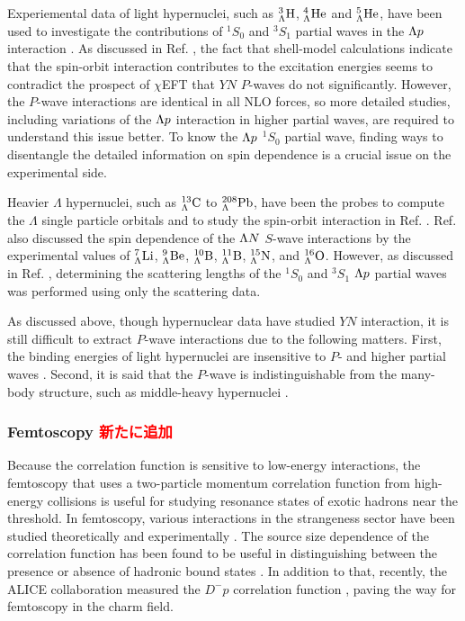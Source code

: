 Experiemental data of light hypernuclei, such as ${}_\Lambda^3\rm{H}$, ${}_\Lambda^4\rm{He}$ and ${}_\Lambda^5\rm{He}$, have been used to investigate the contributions of $^1S_0$ and $^3S_1$ partial waves in the $\Lambda p$ interaction \cite{chiEFT-2020}\cite{chiEFT-2020_2}. As discussed in Ref. \cite{chiEFT-2020_2}, the fact that shell-model calculations indicate that the spin-orbit interaction contributes to the excitation energies seems to contradict the prospect of $\chi$EFT that $YN$ $P$-waves do not significantly. However, the $P$-wave interactions are identical in all NLO forces, so more detailed studies, including variations of the $\Lambda p$ interaction in higher partial waves, are required to understand this issue better. To know the $\Lambda p$ $^1S_0$ partial wave, finding ways to disentangle the detailed information on spin dependence is a crucial issue on the experimental side. 

Heavier $\Lambda$ hypernuclei, such as ${}_\Lambda^{13}\rm{C}$ to ${}_\Lambda^{208}\rm{Pb}$, have been the probes to compute the $\Lambda$ single particle orbitals and to study the spin-orbit interaction in Ref. \cite{chiEFT-2009}. Ref. \cite{shell-2005} also discussed the spin dependence of the $\Lambda N$ $S$-wave interactions by the experimental values of ${}_\Lambda^7\rm{Li}$, ${}_\Lambda^9\rm{Be}$, ${}_\Lambda^{10}\rm{B}$, ${}_\Lambda^{11}\rm{B}$, ${}_\Lambda^{15}\rm{N}$, and ${}_\Lambda^{16}\rm{O}$. However, as discussed in Ref. \cite{Lp-1968_Alex}, determining the scattering lengths of the $^1S_0$ and $^3S_1$ $\Lambda p$ partial waves was performed using only the scattering data. %

As discussed above, though hypernuclear data have studied $YN$ interaction, it is still difficult to extract $P$-wave interactions due to the following matters. First, the binding energies of light hypernuclei are insensitive to $P$- and higher partial waves \cite{chiEFT-2020_2}. Second, it is said that the $P$-wave is indistinguishable from the many-body structure, such as middle-heavy hypernuclei \cite{Isaka-2017}. 

\subsubsection{Femtoscopy \textcolor{red}{新たに追加}}
Because the correlation function is sensitive to low-energy interactions, the femtoscopy that uses a two-particle momentum correlation function from high-energy collisions is useful for studying resonance states of exotic hadrons near the threshold. In femtoscopy, various interactions in the strangeness sector have been studied theoretically \cite{fem-th-1, fem-th-2, fem-th-3, fem-th-4, fem-th-5, fem-th-6, fem-th-7, fem-th-8, fem-th-9} and experimentally \cite{fem-ex-1, fem-ex-2, fem-ex-3, fem-ex-4, fem-ex-5, fem-ex-6, fem-ex-7, fem-ex-8, fem-ex-9, fem-ex-10, fem-ex-11, fem-ex-12}. The source size dependence of the correlation function has been found to be useful in distinguishing between the presence or absence of hadronic bound states \cite{fem-th-7, fem-th-8}. In addition to that, recently, the ALICE collaboration measured the $D^{-}p$ correlation function \cite{fem-ex-13}, paving the way for femtoscopy in the charm field. 


